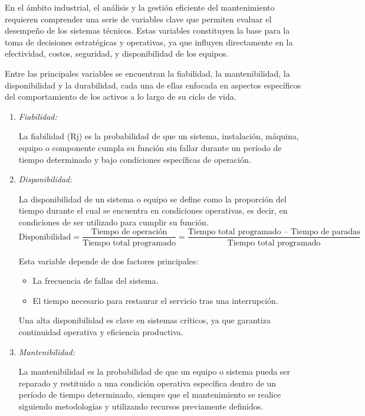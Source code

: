 \documentclass[a4paper,oneside,11pt]{article}
\begin{document}
En el ámbito industrial, el análisis y la gestión eficiente del mantenimiento requieren comprender una serie de variables clave que permiten evaluar el desempeño de los sistemas técnicos. Estas variables constituyen la base para la toma de decisiones estratégicas y operativas, ya que influyen directamente en la efectividad, costos, seguridad, y disponibilidad de los equipos.

Entre las principales variables se encuentran la fiabilidad, la mantenibilidad, la disponibilidad y la durabilidad, cada una de ellas enfocada en aspectos específicos del comportamiento de los activos a lo largo de su ciclo de vida.

\begin{enumerate}
    \item \textit{Fiabilidad:}

    La fiabilidad (Rj) es la probabilidad de que un sistema, instalación, máquina, equipo o componente cumpla su función sin fallar durante un período de tiempo determinado y bajo condiciones específicas de operación.

    \item \textit{Disponibilidad:}

    La disponibilidad de un sistema o equipo se define como la proporción del tiempo durante el cual se encuentra en condiciones operativas, es decir, en condiciones de ser utilizado para cumplir su función.
    \begin{equation*}
        \text{Disponibilidad} = \dfrac{\text{Tiempo de operación}}{\text{Tiempo total programado}} = \dfrac{\text{Tiempo total programado – Tiempo de paradas}}{\text{Tiempo total programado}}
    \end{equation*}

    Esta variable depende de dos factores principales:

    \begin{itemize}
        \item La frecuencia de fallas del sistema.
        \item El tiempo necesario para restaurar el servicio tras una interrupción.
    \end{itemize}

    Una alta disponibilidad es clave en sistemas críticos, ya que garantiza continuidad operativa y eficiencia productiva.

    \item \textit{Mantenibilidad:}

    La mantenibilidad es la probabilidad de que un equipo o sistema pueda ser reparado y restituido a una condición operativa específica dentro de un período de tiempo determinado, siempre que el mantenimiento se realice siguiendo metodologías y utilizando recursos previamente definidos.


\end{enumerate}
\end{document}
